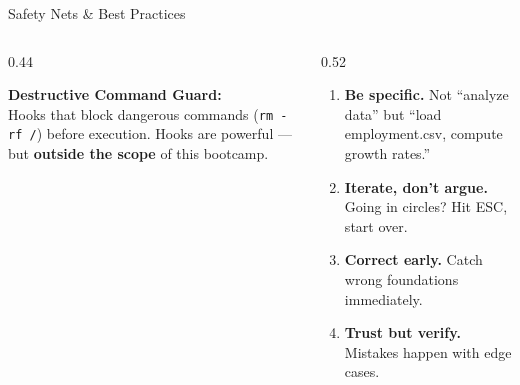 \documentclass[aspectratio=169, 10pt]{beamer}
\begin{document}
\begin{frame}{Safety Nets \& Best Practices}
\begin{columns}[T]
\begin{column}{0.44\textwidth}
\begin{tcolorbox}[keybox, title={\faLock\quad Safety}]
\small
\textbf{Destructive Command Guard:}\\
Hooks that block dangerous commands (\texttt{rm -rf /}) before execution.
\vskip3pt
Hooks are powerful --- but \textbf{outside the scope} of this bootcamp.
\end{tcolorbox}
\end{column}
\begin{column}{0.52\textwidth}
\begin{tcolorbox}[keybox, title={\faLightbulb\quad Four Prompting Rules}]
\small
\begin{enumerate}\setlength{\itemsep}{1pt}
  \item \textbf{Be specific.}
    {\scriptsize Not ``analyze data'' but ``load employment.csv, compute growth rates.''}
  \item \textbf{Iterate, don't argue.}
    {\scriptsize Going in circles? Hit ESC, start over.}
  \item \textbf{Correct early.}
    {\scriptsize Catch wrong foundations immediately.}
  \item \textbf{Trust but verify.}
    {\scriptsize Mistakes happen with edge cases.}
\end{enumerate}
\end{tcolorbox}
\end{column}
\end{columns}
\end{frame}
\end{document}
